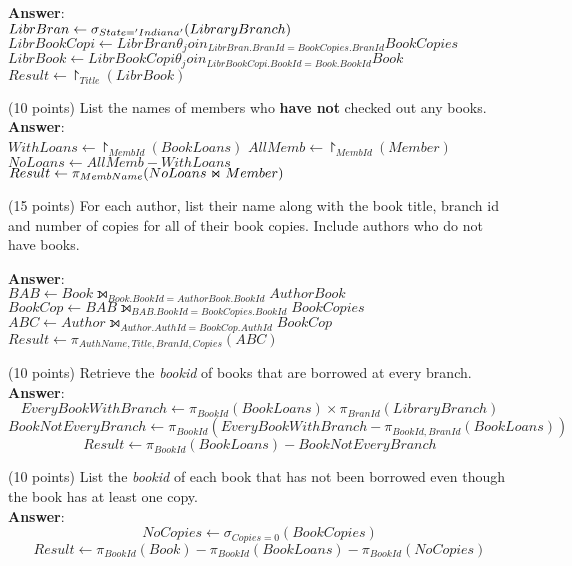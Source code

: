 \begin{questions}
\begin{choices}
	\textbf{Answer}:\\
	$ LibrBran \leftarrow \sigma_{State='Indiana' } (LibraryBranch) $
	$ LibrBookCopi \leftarrow  LibrBran \theta_join_{LibrBran.BranId =BookCopies.BranId } BookCopies $
	$ LibrBook \leftarrow  LibrBookCopi \theta_join_{LibrBookCopi.BookId =Book.BookId } Book $
    $ Result \leftarrow \project_{Title} (LibrBook)$
	
	\choice(10 points) List the names of members who \textbf{have not} checked out any books. \\
	\textbf{Answer}:\\
	$ WithLoans \leftarrow \project_{MembId} (BookLoans)$
	$ AllMemb \leftarrow \project_{MembId} (Member) $
	$ NoLoans \leftarrow AllMemb - WithLoans $
    $ Result \leftarrow \pi_{MembName} (NoLoans \Join Member) $
	
	\choice(15 points) For each author, list their name along with the book title, branch id and  number of copies for all of their book copies. Include authors who do not have books.  
	
    \textbf{Answer}:\\
	$BAB \leftarrow Book \leftouterjoin_{Book.BookId =AuthorBook.BookId } AuthorBook $
	$BookCop \leftarrow BAB \leftouterjoin_{BAB.BookId =BookCopies.BookId } BookCopies $
	$ABC \leftarrow Author \leftouterjoin_{Author.AuthId =BookCop.AuthId } BookCop $
	$Result \leftarrow \pi_{AuthName, Title, BranId, Copies} (ABC)$
	
	
	\choice(10 points) Retrieve the \textit{bookid} of books that are borrowed at every branch. \\
    \textbf{Answer}:\\
    $$EveryBookWithBranch \leftarrow \pi_{BookId}(BookLoans) \times \pi_{BranId}(LibraryBranch)$$
    $$BookNotEveryBranch \leftarrow \pi_{BookId}(EveryBookWithBranch - \pi_{BookId, BranId}(BookLoans))$$
    $$Result \leftarrow \pi_{BookId}(BookLoans) - BookNotEveryBranch$$
    
   
	
	\choice(10 points) List the \textit{bookid} of each book that has not been borrowed even though the book has at least one copy. \\
    \textbf{Answer}:\\
     $$NoCopies \leftarrow \sigma_{Copies=0}(BookCopies)$$
     $$Result \leftarrow \pi_{BookId}(Book) - \pi_{BookId}(BookLoans) - \pi_{BookId}(NoCopies)$$
    

\end{choices}
\end{questions}
